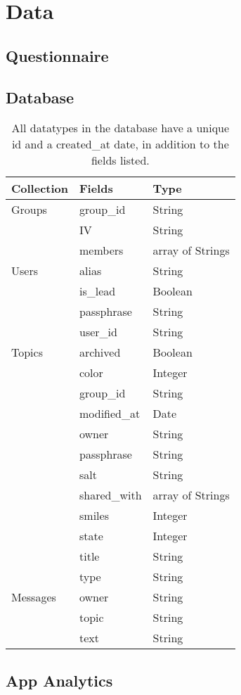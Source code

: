 \chapter{Data}
\section{Questionnaire}

\section{Database}
\label{sec:appb_data}
\vspace*{-3in}
    \renewcommand{\arraystretch}{1.2}
    \begin{table}
    \centering
    \begin{tabular}{  l  l  l }
    \hline
    Collection & Fields & Type \\
    \hline
    Groups
    & group\_id & String \\
    & IV & String \\
    & members & array of Strings \\
    \hline
    Users
    & alias & String \\
    & is\_lead & Boolean \\
    & passphrase & String \\
    & user\_id & String \\
    \hline
    Topics
    & archived & Boolean \\
    & color & Integer \\
    & group\_id & String \\
    & modified\_at & Date \\
    & owner & String \\
    & passphrase & String \\
    & salt & String \\
    & shared\_with & array of Strings \\
    & smiles & Integer \\
    & state & Integer \\
    & title & String \\
    & type & String \\
    \hline
    Messages
    & owner & String \\
    & topic & String \\
    & text & String \\
    \end{tabular}
    \caption[Datatypes in DB]{
    All datatypes in the database have a unique id and a created\_at date,
    in addition to the fields listed.}
    \label{fig:api_table}
    \end{table}

\section{App Analytics}


\clearpage
\newpage
